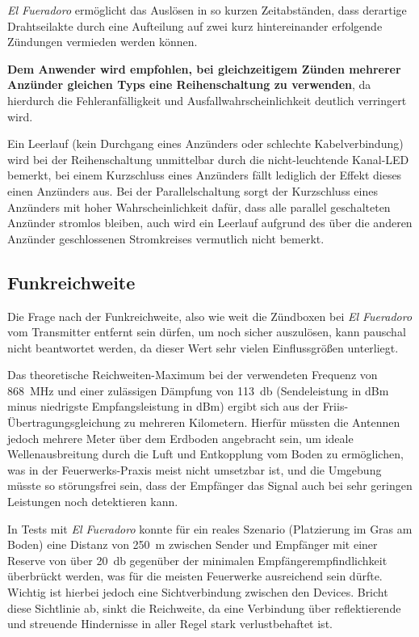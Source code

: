 \documentclass[paper=a4, parskip, numbers=noenddot, toc=listof, headsepline]{scrbook}
\newcommand{\anlage}{\emph{El Fueradoro}}
\begin{document}
					{\anlage} ermöglicht das Auslösen in so kurzen Zeitabständen, dass derartige Drahtseilakte durch eine Aufteilung auf zwei kurz hintereinander erfolgende Zündungen vermieden werden können.

				\textbf{Dem Anwender wird empfohlen, bei gleichzeitigem Zünden mehrerer Anzünder gleichen Typs eine Reihenschaltung zu verwenden}, da hierdurch die Fehleranfälligkeit und Ausfallwahrscheinlichkeit deutlich verringert wird.

				Ein Leerlauf (kein Durchgang eines Anzünders oder schlechte Kabelverbindung) wird bei der Reihenschaltung unmittelbar durch die nicht-leuchtende Kanal-LED bemerkt, bei einem Kurzschluss eines Anzünders fällt lediglich der Effekt dieses einen Anzünders aus. Bei der Parallelschaltung sorgt der Kurzschluss eines Anzünders mit hoher Wahrscheinlichkeit dafür, dass alle parallel geschalteten Anzünder stromlos bleiben, auch wird ein Leerlauf aufgrund des über die anderen Anzünder geschlossenen Stromkreises vermutlich nicht bemerkt.

			\subsection{Funkreichweite}

				Die Frage nach der Funkreichweite, also wie weit die Zündboxen bei {\anlage} vom Transmitter entfernt sein dürfen, um noch sicher auszulösen, kann pauschal nicht beantwortet werden, da dieser Wert sehr vielen Einflussgrößen unterliegt.

				Das theoretische Reichweiten-Maximum bei der verwendeten Frequenz von \SI{868}{\mega\hertz} und einer zulässigen Dämpfung von \SI{113}{\decibel} (Sendeleistung in dBm minus niedrigste Empfangsleistung in dBm) ergibt sich aus der Friis-Übertragungsgleichung zu mehreren Kilometern. Hierfür müssten die Antennen jedoch mehrere Meter über dem Erdboden angebracht sein, um ideale Wellenausbreitung durch die Luft und Entkopplung vom Boden zu ermöglichen, was in der Feuerwerks-Praxis meist nicht umsetzbar ist, und die Umgebung müsste so störungsfrei sein, dass der Empfänger das Signal auch bei sehr geringen Leistungen noch detektieren kann.

				In Tests mit {\anlage} konnte für ein reales Szenario (Platzierung im Gras am Boden) eine Distanz von \SI{250}{\meter} zwischen Sender und Empfänger mit einer Reserve von über \SI{20}{\decibel} gegenüber der minimalen Empfänger\-empfindlichkeit überbrückt werden, was für die meisten Feuerwerke ausreichend sein dürfte. Wichtig ist hierbei jedoch eine Sichtverbindung zwischen den Devices. Bricht diese Sichtlinie ab, sinkt die Reichweite, da eine Verbindung über reflektierende und streuende Hindernisse in aller Regel stark verlustbehaftet ist.
\end{document}
